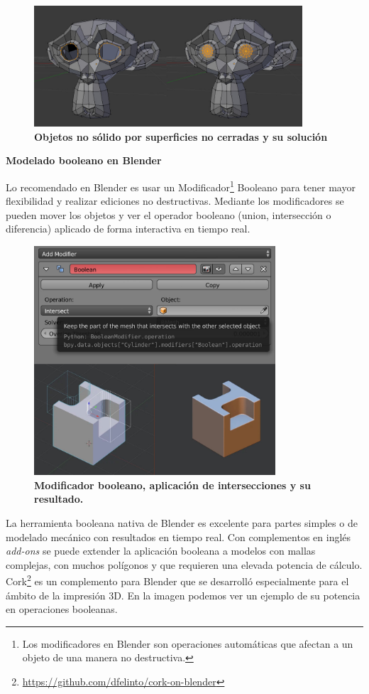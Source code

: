 \begin{figure}[h]
\includegraphics[width=10cm]{Img/Modelos/modelado21.jpg}
\centering
\caption{\textbf{ \footnotesize{Objetos no sólido por superficies no cerradas y su solución }}}
\label{fig:blender}
\end{figure}


\textbf{Modelado booleano en Blender}

Lo recomendado en Blender es usar un Modificador\footnote{
Los modificadores en Blender son operaciones automáticas que afectan a un objeto de una manera no destructiva.} Booleano para tener mayor flexibilidad y realizar ediciones no destructivas. Mediante los modificadores se pueden mover los objetos y ver el operador booleano (union, intersección o diferencia) aplicado de forma interactiva en tiempo real.

\begin{figure}[h]
\includegraphics[width=9cm]{Img/Modelos/modelado22.jpg}
\centering
\caption{\textbf{ \footnotesize{Modificador booleano, aplicación de intersecciones y su resultado. }}}
\end{figure}

La herramienta booleana nativa de Blender es excelente para partes simples o de modelado mecánico con resultados en tiempo real. Con complementos en inglés \textit{add-ons} se puede extender la aplicación booleana a modelos con mallas complejas, con muchos polígonos y que requieren una elevada potencia de cálculo.
Cork\footnote{\url{https://github.com/dfelinto/cork-on-blender}} es un complemento para Blender que se desarrolló especialmente para el ámbito de la impresión 3D. En la imagen podemos ver un ejemplo de su potencia en operaciones booleanas.

